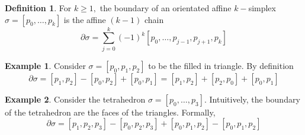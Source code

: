 \documentclass[10pt, oneside]{article}
\theoremstyle{definition}
\newtheorem{exmp}{Example}[section]
\newtheorem{defn}{Definition}
\begin{document}
\begin{defn}
    For $k \geq 1,$ the boundary of an orientated affine $k-$simplex  $\sigma = [p_0, \dots, p_k]$ is the affine $(k-1)$ chain
    \[\partial \sigma = \sum_{j=0}^k (-1)^k [p_0, \dots, p_{j-1}, p_{j+1}, p_k]\]
\end{defn}
\begin{exmp}
    Consider $\sigma = [p_0, p_1, p_2]$ to be the filled in triangle. By definition
    \[\partial \sigma = [p_1, p_2] - [p_0, p_2] + [p_0, p_1] = [p_1, p_2] + [p_2, p_0] + [p_0, p_1]\]
\end{exmp}
\begin{exmp}
    Consider the tetrahedron $\sigma = [p_0, \dots, p_3].$ Intuitively, the boundary of the tetrahedron are the faces of the triangles. Formally, 
    \[\partial \sigma = [p_1, p_2, p_3] - [p_0, p_2, p_3] + [p_0, p_1, p_2] - [p_0, p_1, p_2]\]
\end{exmp}
\end{document}
